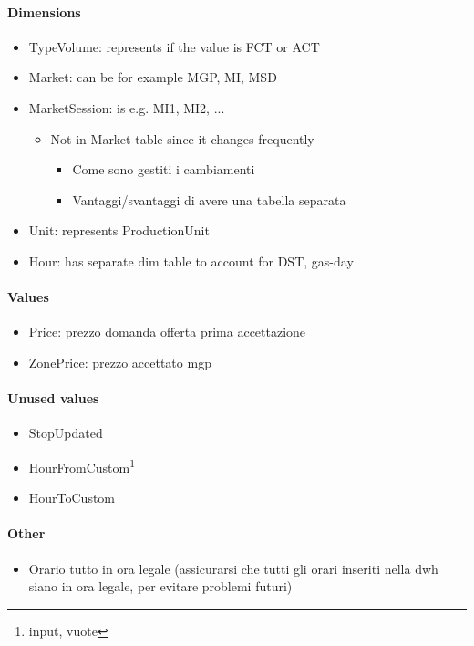         \paragraph{Dimensions}
            \begin{itemize}
                \item {} TypeVolume: represents if the value is FCT or ACT
                \item Market: can be for example MGP, MI, MSD
                \item MarketSession: is e.g. MI1, MI2, ...
                    \begin{itemize}
                        \item {}Not in Market table since it changes frequently
                            \begin{itemize}
                                \item Come sono gestiti i cambiamenti
                                \item Vantaggi/svantaggi di avere una tabella separata
                            \end{itemize}
                    \end{itemize}
                \item {} Unit: represents ProductionUnit
                \item Hour: has separate dim table to account for DST, gas-day
            \end{itemize}
        \paragraph{Values}
            \begin{itemize}
                \item Price: prezzo domanda offerta prima accettazione
                \item {} ZonePrice: prezzo accettato mgp
            \end{itemize}
        \paragraph{Unused values}
            \begin{itemize}
                \item StopUpdated
                \item HourFromCustom\footnote{input, vuote}
                \item HourToCustom
            \end{itemize}
        \paragraph{Other}
            \begin{itemize}
                \item {}Orario tutto in ora legale (assicurarsi che tutti gli orari inseriti nella dwh siano in ora legale, per evitare problemi futuri)
            \end{itemize}
